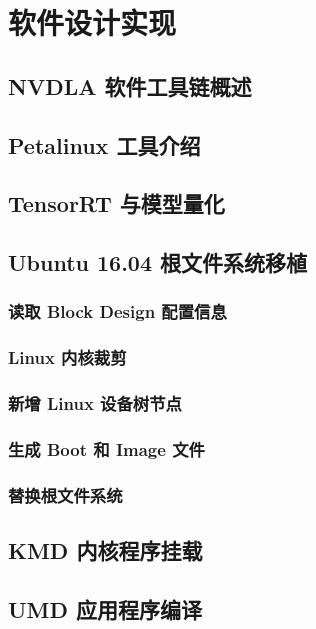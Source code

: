 \chapter{软件设计实现}\label{chap:software}

\section{NVDLA 软件工具链概述}

\section{Petalinux 工具介绍}

\section{TensorRT 与模型量化}

\section{Ubuntu 16.04 根文件系统移植}

\subsection{读取 Block Design 配置信息}

\subsection{Linux 内核裁剪}

\subsection{新增 Linux 设备树节点}

\subsection{生成 Boot 和 Image 文件}

\subsection{替换根文件系统}

\section{KMD 内核程序挂载}

\section{UMD 应用程序编译}
